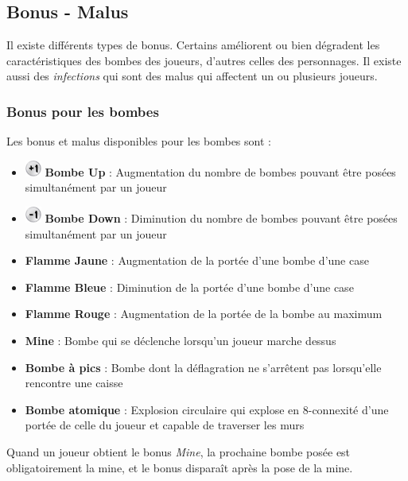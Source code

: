 \subsection{Bonus - Malus}

Il existe différents types de bonus. Certains améliorent ou bien dégradent les caractéristiques des bombes des joueurs, d'autres celles des personnages. Il existe aussi des \textit{infections} qui sont des malus qui affectent un ou plusieurs joueurs.

\subsubsection{Bonus pour les bombes}

Les bonus et malus disponibles pour les bombes sont :
\begin{itemize}
\item \includegraphics[width=20px,height=20px]{images/bombMore.png} \textbf{Bombe Up} : Augmentation du nombre de bombes pouvant être posées simultanément par un joueur
\item \includegraphics[width=20px,height=20px]{images/bombLess.png} \textbf{Bombe Down} : Diminution du nombre de bombes pouvant être posées simultanément par un joueur
\item \textbf{Flamme Jaune} : Augmentation de la portée d'une bombe d'une case
\item \textbf{Flamme Bleue} : Diminution de la portée d'une bombe d'une case
\item \textbf{Flamme Rouge} : Augmentation de la portée de la bombe au maximum
\item \textbf{Mine} : Bombe qui se déclenche lorsqu'un joueur marche dessus
\item \textbf{Bombe à pics} : Bombe dont la déflagration ne s'arrêtent pas lorsqu'elle rencontre une caisse
\item \textbf{Bombe atomique} : Explosion circulaire qui explose en 8-connexité d'une portée de celle du joueur et capable de traverser les murs
\end{itemize}

\vspace{0.3cm}

Quand un joueur obtient le bonus \textit{Mine}, la prochaine bombe posée est obligatoirement la mine, et le bonus disparaît après la pose de la mine.

